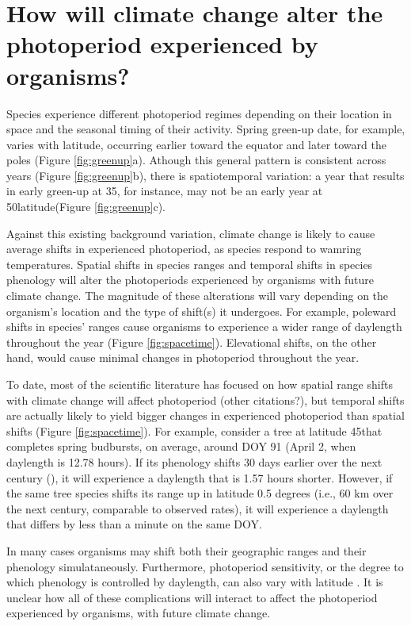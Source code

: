 \documentclass{article}
\begin{document}
\section*{How will climate change alter the photoperiod experienced by organisms?}
\par Species experience different photoperiod regimes depending on their location in space and the seasonal timing of their activity. Spring green-up date, for example, varies with latitude, occurring earlier toward the equator and later toward the poles (Figure \ref{fig:greenup}a). Athough this general pattern is consistent across years (Figure \ref{fig:greenup}b), there is spatiotemporal variation: a year that results in early green-up at 35\degree, for instance, may not be an early year at 50\degree latitude(Figure \ref{fig:greenup}c).
\par Against this existing background variation, climate change is likely to cause average shifts in experienced photoperiod, as species respond to wamring temperatures. Spatial shifts in species ranges and temporal shifts in species phenology will alter the photoperiods experienced by organisms with future climate change. The magnitude of these alterations will vary depending on the organism's location and the type of shift(s) it undergoes. For example, poleward shifts in species' ranges cause organisms to experience a wider range of daylength throughout the year (Figure \ref{fig:spacetime}). Elevational shifts, on the other hand, would cause minimal changes in photoperiod throughout the year. 
\par To date, most of the scientific literature has focused on how spatial range shifts with climate change will affect photoperiod \citep{saikkonen2012} (other citations?), but temporal shifts are actually likely to yield bigger changes in experienced photoperiod than spatial shifts (Figure \ref{fig:spacetime}). For example, consider a tree at latitude 45\degree  that completes spring budbursts, on average, around DOY 91 (April 2, when daylength is 12.78 hours). If its phenology shifts 30 days earlier over the next century (\citep[][i.e., a rate of ~3 days per decade, as has been observed]{parmesan2003}), it will experience a daylength that is 1.57 hours shorter. However, if the same tree species shifts its range up in latitude 0.5 degrees (i.e., 60 km over the next century,  comparable to observed rates\citep{parmesan2003, chen2011}), it will experience a daylength that differs by less than a minute on the same DOY. 

\par In many cases organisms may shift both their geographic ranges and their phenology simulataneously. Furthermore, photoperiod sensitivity, or the degree to which phenology is controlled by daylength, can also vary with latitude \citep{Howe:1996,saikkonen2012,Partanen:2005aa,Vihera-Aarnio:2006aa,Caffarra:2011b,gauzere2017}. It is unclear how all of these complications will interact to affect the photoperiod experienced by organisms, with future climate change.
\end{document}
